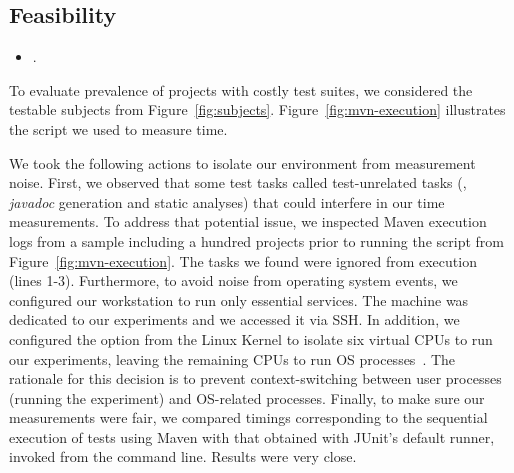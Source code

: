


\subsection{Feasibility}
\label{sec:rqA}
\label{sec:rqB}

\begin{itemize}
    \item \numRQFeasibilityOne{}. \textbf{\RQFeasibilityOne}
\end{itemize}

To evaluate prevalence of projects with costly test suites, we
considered the \numSubjs{} testable subjects from
Figure~\ref{fig:subjects}.  Figure~\ref{fig:mvn-execution} illustrates
the script we used to measure time.

We took the following actions to isolate our environment from
measurement noise.  First, we observed that some test tasks called
test-unrelated tasks (\eg, \emph{javadoc} generation and static
analyses) that could interfere in our time measurements.  To address
that potential issue, we inspected Maven execution logs from a sample
including a hundred projects prior to running the script from
Figure~\ref{fig:mvn-execution}.  The tasks we found were ignored from
execution (lines 1-3).  Furthermore, to avoid noise from operating
system events, we configured our workstation to run only essential
services.  The machine was dedicated to our experiments and we
accessed it via SSH. In addition, we configured the 
option from the Linux Kernel \cite{linux-kernel} to isolate six
virtual CPUs to run our experiments, leaving the remaining CPUs to run
OS processes~\cite{isolcpus-use}.  The rationale for this decision is
to prevent context-switching between user processes (running the
experiment) and OS-related processes.  Finally, to make sure our
measurements were fair, we compared timings corresponding to the
sequential execution of tests using Maven with that obtained with
JUnit's default  runner, invoked from the command
line.  Results were very close.

